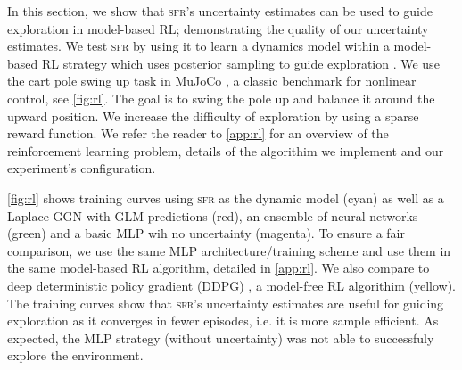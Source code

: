 \documentclass{article}
\newcommand{\our}{\textsc{sfr}\xspace}
\begin{document}





In this section, we show that \our's uncertainty estimates can be used to guide exploration in model-based RL;
demonstrating the quality of our uncertainty estimates.
We test \our by using it to learn a dynamics model within a model-based RL strategy which uses posterior sampling to guide exploration
\cite{osbandMoreEfficientReinforcement2013,osbandWhyPosteriorSampling2017}.
We use the cart pole swing up task in MuJoCo \cite{todorov2012mujoco}, a classic benchmark for nonlinear control, see \cref{fig:rl}.
The goal is to swing the pole up and balance it around the upward position.
We increase the difficulty of exploration by using a sparse reward function.
We refer the reader to \cref{app:rl} for an overview of the reinforcement learning problem, details of the algorithim we implement and our experiment's configuration.

\cref{fig:rl} shows training curves using \our as the dynamic model (cyan) as well as a Laplace-GGN with GLM predictions (red), an ensemble of neural
networks (green) and a basic MLP wih no uncertainty (magenta).
To ensure a fair comparison, we use the same MLP architecture/training scheme and use them in the same model-based RL algorithm, detailed in \cref{app:rl}.
We also compare to deep deterministic policy gradient (DDPG) \cite{lillicrapContinuousControlDeep2016}, a model-free RL algorithim (yellow).
The training curves show that \our's uncertainty estimates are useful for guiding exploration as it converges in fewer episodes, i.e.
it is more sample efficient.
As expected, the MLP strategy (without uncertainty) was not able to successfuly explore the environment.
\end{document}
